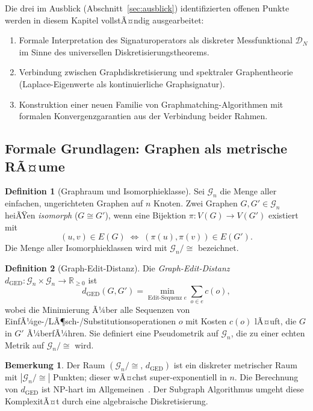 ﻿\documentclass[a4paper,12pt]{article}
\theoremstyle{definition}
\newtheorem{definition}{Definition}
\newtheorem{bemerkung}{Bemerkung}
\begin{document}
Die drei im Ausblick (Abschnitt~\ref{sec:ausblick}) identifizierten offenen Punkte werden in
diesem Kapitel vollstÃ¤ndig ausgearbeitet:
\begin{enumerate}
    \item Formale Interpretation des Signaturoperators als diskreter Messfunktional
          $\mathcal{D}_N$ im Sinne des universellen Diskretisierungstheorems.
    \item Verbindung zwischen Graphdiskretisierung und spektraler Graphentheorie
          (Laplace-Eigenwerte als kontinuierliche Graphsignatur).
    \item Konstruktion einer neuen Familie von Graphmatching-Algorithmen mit formalen
          Konvergenzgarantien aus der Verbindung beider Rahmen.
\end{enumerate}

\subsection{Formale Grundlagen: Graphen als metrische RÃ¤ume}

\begin{definition}[Graphraum und Isomorphieklasse]
    Sei $\mathcal{G}_n$ die Menge aller einfachen, ungerichteten Graphen auf $n$ Knoten.
    Zwei Graphen $G, G' \in \mathcal{G}_n$ heiÃŸen \emph{isomorph} ($G \cong G'$), wenn eine
    Bijektion $\pi : V(G) \to V(G')$ existiert mit
    \[
    (u,v) \in E(G) \;\Longleftrightarrow\; (\pi(u), \pi(v)) \in E(G').
    \]
    Die Menge aller Isomorphieklassen wird mit $\mathcal{G}_n/{\cong}$ bezeichnet.
\end{definition}

\begin{definition}[Graph-Edit-Distanz]
    Die \emph{Graph-Edit-Distanz} $d_{\mathrm{GED}} : \mathcal{G}_n \times \mathcal{G}_n \to \mathbb{R}_{\geq 0}$ ist
    \[
    d_{\mathrm{GED}}(G, G') = \min_{\text{Edit-Sequenz } e} \sum_{o \in e} c(o),
    \]
    wobei die Minimierung Ã¼ber alle Sequenzen von EinfÃ¼ge-/LÃ¶sch-/Substitutionsoperationen
    $o$ mit Kosten $c(o)$ lÃ¤uft, die $G$ in $G'$ Ã¼berfÃ¼hren. Sie definiert eine Pseudometrik
    auf $\mathcal{G}_n$, die zu einer echten Metrik auf $\mathcal{G}_n/{\cong}$ wird.
\end{definition}

\begin{bemerkung}
    Der Raum $(\mathcal{G}_n/{\cong},\, d_{\mathrm{GED}})$ ist ein diskreter metrischer Raum
    mit $|\mathcal{G}_n/{\cong}|$ Punkten; dieser wÃ¤chst super-exponentiell in $n$.
    Die Berechnung von $d_{\mathrm{GED}}$ ist NP-hart im Allgemeinen~\cite{zeng2009}.
    Der Subgraph Algorithmus umgeht diese KomplexitÃ¤t durch eine algebraische Diskretisierung.
\end{bemerkung}
\end{document}
